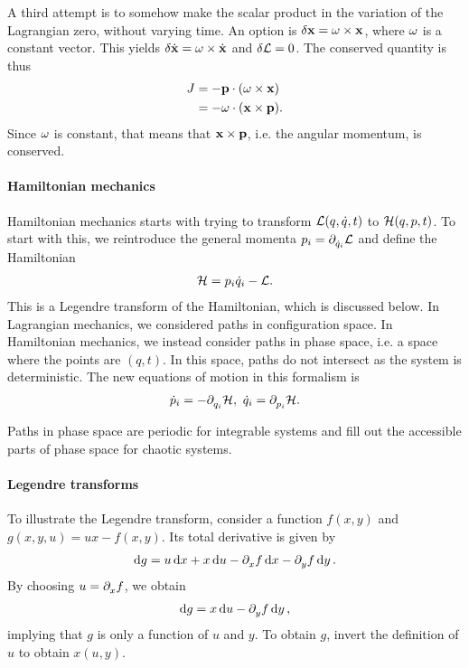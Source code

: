 A third attempt is to somehow make the scalar product in the variation of the Lagrangian zero, without varying time. An option is $\delta \vb{x} = \vb{\omega}\times\vb{x}$, where $\vb{\omega}$ is a constant vector. This yields $\delta \dot{\vb{x}} = \vb{\omega}\times\dot{\vb{x}}$ and $\delta \mathcal{L} = 0$. The conserved quantity is thus
\begin{align*}
	J &= -\vb{p}\cdot(\vb{\omega}\times\vb{x}) \\
	  &= -\vb{\omega}\cdot(\vb{x}\times\vb{p}).
\end{align*}
Since $\vb{\omega}$ is constant, that means that $\vb{x}\times\vb{p}$, i.e. the angular momentum, is conserved.

\paragraph{Hamiltonian mechanics}
Hamiltonian mechanics starts with trying to transform $\mathcal{L}(q, \dot{q}, t)$ to $\mathcal{H}(q, p, t)$. To start with this, we reintroduce the general momenta $p_{i} = \partial^{}_{\dot{q}_{i}}\mathcal{L}$ and define the Hamiltonian
\begin{align*}
	\mathcal{H} = p_{i}\dot{q}_{i} - \mathcal{L}.
\end{align*}
This is a Legendre transform of the Hamiltonian, which is discussed below. In Lagrangian mechanics, we considered paths in configuration space. In Hamiltonian mechanics, we instead consider paths in phase space, i.e. a space where the points are $(q, t)$. In this space, paths do not intersect as the system is deterministic. The new equations of motion in this formalism is
\begin{align*}
	\dot{p}_{i} = -\partial^{}_{q_{i}}\mathcal{H},\ \dot{q}_{i} = \partial^{}_{p_{i}}\mathcal{H}.
\end{align*}

Paths in phase space are periodic for integrable systems and fill out the accessible parts of phase space for chaotic systems.

\paragraph{Legendre transforms}
To illustrate the Legendre transform, consider a function $f(x, y)$ and $g(x, y, u) = ux - f(x, y)$. Its total derivative is given by
\begin{align*}
	\dd{g} = u\dd{x} + x\dd{u} - \partial^{}_{x}f\dd{x} - \partial^{}_{y}f\dd{y}.
\end{align*}
By choosing $u = \partial^{}_{x}f$, we obtain
\begin{align*}
	\dd{g} = x\dd{u} - \partial^{}_{y}f\dd{y},
\end{align*}
implying that $g$ is only a function of $u$ and $y$. To obtain $g$, invert the definition of $u$ to obtain $x(u, y)$.

